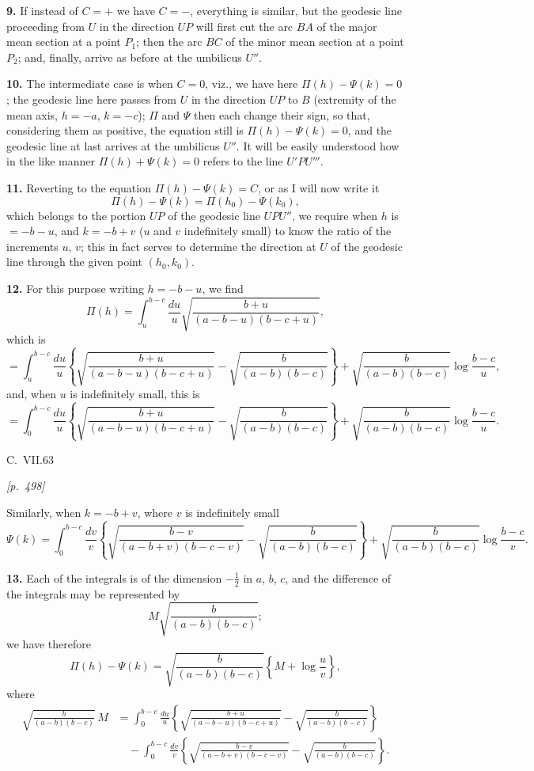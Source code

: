 \documentclass[11pt]{article}
\begin{document}
\textbf{9.} If instead of $C=+$ we have $C=-$, everything is similar, but
the geodesic line proceeding from $U$ in the direction $UP$ will first cut
the arc $BA$ of the major mean section at a point $P_{1}$; then the arc
$BC$ of the minor mean section at a point $P_{2}$; and, finally, arrive as
before at the umbilicus $U''$.

\textbf{10.} The intermediate case is when $C=0$, viz., we have here
$\Pi(h)-\Psi(k)=0$; the geodesic line here passes from $U$ in the
direction $UP$ to $B$ (extremity of the mean axis, $h=-a$, $k=-c$);
$\Pi$ and $\Psi$ then each change their sign, so that, considering them as
positive, the equation still is $\Pi(h)-\Psi(k)=0$, and the geodesic line
at last arrives at the umbilicus $U''$. It will be easily understood how
in the like manner $\Pi(h)+\Psi(k)=0$ refers to the line $U'PU'''$.

\textbf{11.} Reverting to the equation $\Pi(h)-\Psi(k)=C$, or as I will
now write it
\[
\Pi(h)-\Psi(k)=\Pi(h_{0})-\Psi(k_{0}),
\]
which belongs to the portion $UP$ of the geodesic line $UPU''$, we
require when $h$ is $=-b-u$, and $k=-b+v$ ($u$ and $v$ indefinitely
small) to know the ratio of the increments $u$, $v$; this in fact serves
to determine the direction at $U$ of the geodesic line through the given
point $(h_{0},k_{0})$.

\textbf{12.} For this purpose writing $h=-b-u$, we find
\[
\Pi(h)=\int_{u}^{b-c}\frac{du}{u}\sqrt{\frac{b+u}{(a-b-u)(b-c+u)}},
\]
which is
\[
=\int_{u}^{b-c}\frac{du}{u}\left\{\sqrt{\frac{b+u}{(a-b-u)(b-c+u)}}
-\sqrt{\frac{b}{(a-b)(b-c)}}\right\}
+\sqrt{\frac{b}{(a-b)(b-c)}}\log\frac{b-c}{u},
\]
and, when $u$ is indefinitely small, this is
\[
=\int_{0}^{b-c}\frac{du}{u}\left\{\sqrt{\frac{b+u}{(a-b-u)(b-c+u)}}
-\sqrt{\frac{b}{(a-b)(b-c)}}\right\}
+\sqrt{\frac{b}{(a-b)(b-c)}}\log\frac{b-c}{u}.
\]

\medskip

\hfill C.\ VII.\hfill 63

\newpage

\noindent\textit{[p.~498]}

\medskip

\noindent
Similarly, when $k=-b+v$, where $v$ is indefinitely small
\[
\Psi(k)=\int_{0}^{b-c}\frac{dv}{v}\left\{\sqrt{\frac{b-v}{(a-b+v)(b-c-v)}}
-\sqrt{\frac{b}{(a-b)(b-c)}}\right\}
+\sqrt{\frac{b}{(a-b)(b-c)}}\log\frac{b-c}{v}.
\]

\textbf{13.} Each of the integrals is of the dimension $-\tfrac{1}{2}$ in
$a$, $b$, $c$, and the difference of the integrals may be represented by
\[
M\sqrt{\frac{b}{(a-b)(b-c)}};
\]
we have therefore
\[
\Pi(h)-\Psi(k)=\sqrt{\frac{b}{(a-b)(b-c)}}\left\{M+\log\frac{u}{v}\right\},
\]
where
\begin{align*}
\sqrt{\frac{b}{(a-b)(b-c)}}\,M
&= \int_{0}^{b-c}\frac{du}{u}\left\{\sqrt{\frac{b+u}{(a-b-u)(b-c+u)}}
   -\sqrt{\frac{b}{(a-b)(b-c)}}\right\}\\
&\quad - \int_{0}^{b-c}\frac{dv}{v}\left\{\sqrt{\frac{b-v}{(a-b+v)(b-c-v)}}
   -\sqrt{\frac{b}{(a-b)(b-c)}}\right\}.
\end{align*}
\end{document}
